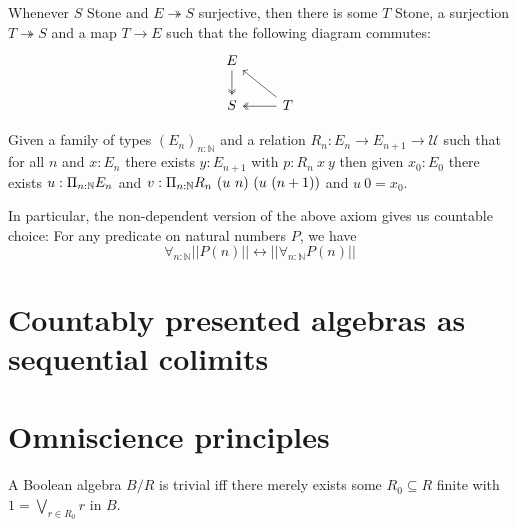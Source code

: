 \documentclass{../util/zariski-small}
\begin{document}
\begin{axiomNum}
  Whenever $S$ Stone and $E\twoheadrightarrow S$ surjective, then there is some $T$ Stone,
    a surjection $T \twoheadrightarrow S$ and a map $T\to E$ 
    such that the following diagram commutes:
    \begin{equation}\begin{tikzcd}
      E \arrow[d,""',two heads]\\
      S & \arrow[l, "", two heads] T\arrow[lu, ""']
    \end{tikzcd}\end{equation}  
\end{axiomNum} 

\begin{axiomNum}\label{axDependentChoice}
  Given a family of types $(E_n)_{n:\mathbb N}$ and 
  a relation 
  $R_n:E_n\rightarrow E_{n+1}\rightarrow {\mathcal U}$ such that
  for all $n$ and $x:E_n$ there exists $y:E_{n+1}$ with $p:R_n~x~y$ 
  then given $x_0:E_0$ there exists
  $u:\Pi_{n:\mathbb{N}}E_n$ and $v:\Pi_{n:\mathbb{N}}R_n~(u~n)~(u~(n+1))$ and $u~0 = x_0$.
\end{axiomNum}
\begin{corollary}
  In particular, the non-dependent version of the above axiom gives 
  us countable choice:
  For any predicate on natural numbers $P$, we have 
  \begin{equation}
    \forall_{n:\mathbb N} ||P(n) ||
    \leftrightarrow 
    || \forall_{n:\mathbb N} P(n) ||
  \end{equation}
\end{corollary}

\section{Countably presented algebras as sequential colimits}


\section{Omniscience principles}
\begin{remark}\label{rmkTrivialBA}
  A Boolean algebra $B / R$ 
  is trivial iff there merely exists some $R_0\subseteq R$ finite with 
  $1 = \bigvee_{r \in R_0} r$ in $B$.
\end{remark}
\end{document}
